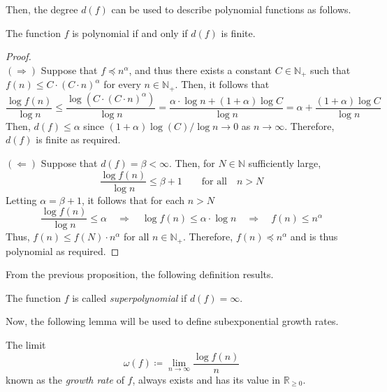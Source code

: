 Then, the degree $d(f)$ can be used to describe polynomial functions as follows.

\begin{proposition}
	The function $f$ is polynomial if and only if $d(f)$ is finite.
\end{proposition}

\begin{proof}
	\ \\
	$(\Longrightarrow)$
	Suppose that $f \preccurlyeq n^\alpha$, and thus there exists a constant $C \in \mathbb{N}_+$ such that $f(n) \leq C \cdot (C \cdot n)^\alpha$ for every $n \in \mathbb{N}_+$.
	Then, it follows that
	\[
	  \frac{\log f(n)}{\log n}
	  \leq
	  \frac{\log\left(C \cdot (C \cdot n)^\alpha\right)}{\log n}
	  =
	  \frac{\alpha \cdot \log n + (1+\alpha) \log C}{\log n}
	  =
	  \alpha + \frac{(1+\alpha) \log C}{\log n}
	\]
	Then, $d(f) \leq \alpha$ since $(1+\alpha)\log(C)/\log n \to 0$ as $n \to \infty$.
	Therefore, $d(f)$ is finite as required.
	
	$(\Longleftarrow)$
	Suppose that $d(f) = \beta < \infty$.
	Then, for $N \in \mathbb{N}$ sufficiently large,
	\[
	  \frac{\log f (n)}{\log n} \leq \beta + 1
	  \qquad
	  \text{for all}
	  \quad
	  n > N
	\]
	Letting $\alpha = \beta + 1$, it follows that for each $n > N$
	\[
	  \frac{\log f (n)}{\log n}
	  \leq \alpha
	  \quad
	  \Longrightarrow
	  \quad
	  \log f(n) \leq \alpha \cdot \log n
	  \quad
	  \Longrightarrow
	  \quad
	  f(n) \leq n^\alpha
	\]
	Thus, $f(n) \leq f(N) \cdot n^{\alpha}$ for all $n \in \mathbb{N}_+$.
	Therefore, $f(n) \preccurlyeq n^{\alpha}$ and is thus polynomial as required.
\end{proof}

From the previous proposition, the following definition results.

\begin{definition}
	\label{def:superpolynomial}
	The function $f$ is called \emph{superpolynomial} if $d(f) = \infty$.
	\thmendmark
\end{definition}

Now, the following lemma will be used to define subexponential growth rates.

\begin{lemma}
	\label{lemma:growth-rate-bound}
	The limit
	\[
	  \omega(f) \coloneqq \lim_{n \to \infty} \frac{\log f(n)}{n}
	\]
	known as the \emph{growth rate} of $f$, always exists and has its value in $\mathbb{R}_{\geq 0}$.
	\thmendmark
\end{lemma}

